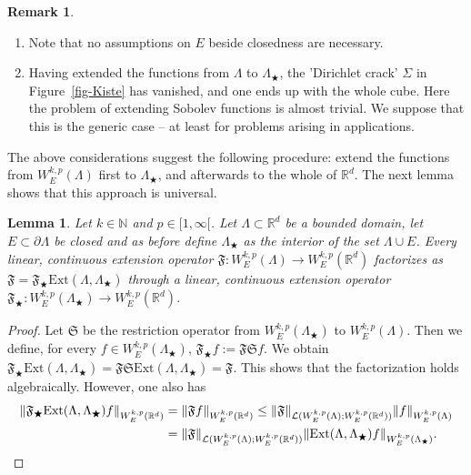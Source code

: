 \documentclass[10pt,leqno]{amsart}
\newtheorem{lemma}[theorem]{Lemma}
\theoremstyle{definition}
\newtheorem{remark}[theorem]{Remark}
\numberwithin{equation}{section}
\begin{document}
\begin{remark} \label{r-arbitrar}
 \begin{enumerate}
  \item Note that no assumptions on $E$ beside closedness are necessary.
  \item Having extended the functions from $\Lambda$ to $\Lambda_\bigstar $, the
	'Dirichlet crack' $\Sigma$ in Figure~\ref{fig-Kiste} has vanished, and
	one ends up with the whole cube. Here the problem of extending Sobolev
	functions is almost trivial. We suppose that this is the generic case --
	at least for problems arising in applications.
 \end{enumerate} 
\end{remark}

The above considerations suggest the following procedure: extend the functions
from $W^{k,p}_E(\Lambda)$ first to $\Lambda_\bigstar$, and afterwards to the
whole of ${{\mathbb R}}^d$. The next lemma shows that this approach is universal.

\begin{lemma} \label{l-exten0}
 Let $k \in {{\mathbb N}}$ and $p \in {[1,\infty[}$. Let $\Lambda \subset {{\mathbb R}}^d$ be a
 bounded domain, let $E \subset \partial \Lambda$ be closed and as before define
 $\Lambda_\bigstar$ as the interior of the set $\Lambda \cup E$. Every linear,
 continuous extension operator $\mathfrak F : W^{k,p}_E(\Lambda)
 \to W^{k,p}_E({{\mathbb R}}^d)$ factorizes as $\mathfrak F = {\mathfrak F}_\bigstar
 \mathrm{Ext}(\Lambda, \Lambda_\bigstar)$ through a linear, continuous extension
 operator ${\mathfrak F}_\bigstar : W^{k,p}_E(\Lambda_\bigstar) \to
 W^{k,p}_E({{\mathbb R}}^d)$.
\end{lemma}

\begin{proof}
Let $\mathfrak S$ be the restriction operator from $W^{k,p}_E(\Lambda_\bigstar)$
to $W^{k,p}_E(\Lambda)$. Then we define, for every $f \in
W^{k,p}_E(\Lambda_\bigstar)$,
$\mathfrak F_\bigstar f:=\mathfrak F \mathfrak Sf$. We obtain
$\mathfrak F_\bigstar \mathrm{Ext}(\Lambda, \Lambda_\bigstar)=\mathfrak F
\mathfrak S
\mathrm{Ext}(\Lambda, \Lambda_\bigstar) =\mathfrak F$.
This shows that the factorization holds algebraically. However, one also has
 \begin{align*}
   \|{\mathfrak F}_\bigstar \mathrm{Ext}(\Lambda, \Lambda_\bigstar) f
	\|_{W^{k,p}_E({{\mathbb R}}^d)} &= \| \mathfrak F f \|_{W^{k,p}_E({{\mathbb R}}^d)} \le
	\| \mathfrak F \|_{\mathcal L(W^{k,p}_E(\Lambda);W^{k,p}_E({{\mathbb R}}^d))}
	\|f\|_{W^{k,p}_E(\Lambda)} \\
   &= \|\mathfrak F \|_{\mathcal L(W^{k,p}_E(\Lambda);W^{k,p}_E({{\mathbb R}}^d))}
	\| \mathrm{Ext}(\Lambda, \Lambda_\bigstar) f
	\|_{W^{k,p}_E(\Lambda_\bigstar)}.
  \qedhere
 \end{align*}
\end{proof}
\end{document}

